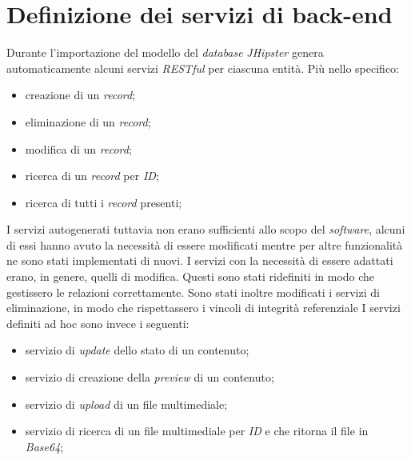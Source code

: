 \section{Definizione dei servizi di back-end}
Durante l'importazione del modello del \textit{database} \textit{JHipster} genera automaticamente alcuni servizi \textit{RESTful} per ciascuna entità. Più nello specifico:
\begin{itemize}
    \item creazione di un \textit{record};
    \item eliminazione di un \textit{record};
    \item modifica di un \textit{record};
    \item ricerca di un \textit{record} per \textit{ID};
    \item ricerca di tutti i \textit{record} presenti;
\end{itemize}
I servizi autogenerati tuttavia non erano sufficienti allo scopo del \textit{software}, alcuni di essi hanno avuto la necessità di essere modificati mentre per altre funzionalità ne sono stati implementati di nuovi. I servizi con la necessità di essere adattati erano, in genere, quelli di modifica. Questi sono stati ridefiniti in modo che gestissero le relazioni correttamente. Sono stati inoltre modificati i servizi di eliminazione, in modo che rispettassero i vincoli di integrità referenziale
I servizi definiti ad hoc sono invece i seguenti:
\begin{itemize}
    \item servizio di \textit{update} dello stato di un contenuto;
    \item servizio di creazione della \textit{preview} di un contenuto;
    \item servizio di \textit{upload} di un file multimediale;
    \item servizio di ricerca di un file multimediale per \textit{ID} e che ritorna il file in \textit{Base64};
\end{itemize}

